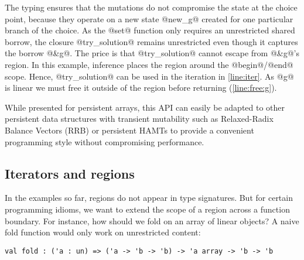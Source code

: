 The typing ensures that the mutations do not compromise the state at
the choice point, because they operate on a new state @new_g@ created for one
particular branch of the choice.
As the @set@ function only requires an unrestricted shared borrow,
the closure @try_solution@ remains unrestricted even though
it captures the borrow @&g@.
The price is that @try_solution@ cannot escape from
@&g@'s region. In this example, inference places the region
around the @begin@/@end@ scope.
Hence, @try_solution@ can be used in
the iteration in \cref{line:iter}.
As @g@ is linear we must free it outside of the region
before returning (\cref{line:free:g}).

While presented for persistent arrays, this API
can easily be adapted to other persistent data structures with
transient mutability such as Relaxed-Radix Balance Vectors (RRB) \cite{DBLP:journals/pacmpl/Puente17}
or persistent HAMTs \cite{bagwell2001ideal,clojurehamt} to provide  a
convenient programming style without compromising performance.




\subsection{Iterators and regions}
\label{tuto:vector}

In the examples so far, regions do not appear in type signatures.
But for certain programming idioms, we want to extend the scope of a
region across a function boundary.
For instance, how should we fold on an array of linear objects?
A naive fold function would only work on unrestricted content:
\begin{lstlisting}
val fold : ('a : un) => ('a -> 'b -> 'b) -> 'a array -> 'b -> 'b
\end{lstlisting}

